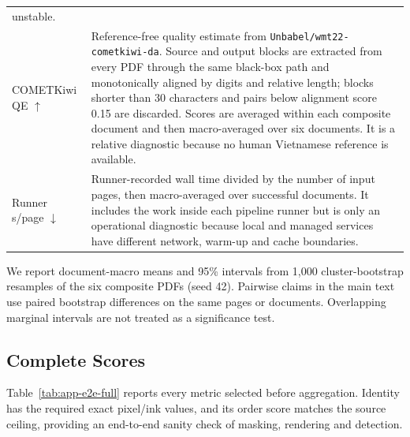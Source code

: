 \begin{table}[H]
\begin{tabularx}{\textwidth}{@{}l >{\raggedright\arraybackslash}X@{}}
unstable. \\
COMETKiwi QE $\uparrow$ & Reference-free quality estimate from
\texttt{Unbabel/wmt22-cometkiwi-da}. Source and output blocks are extracted from
every PDF through the same black-box path and monotonically aligned by digits and
relative length; blocks shorter than 30 characters and pairs below alignment
score 0.15 are discarded. Scores are averaged within each composite document and then
macro-averaged over six documents. It is a relative diagnostic because no human
Vietnamese reference is available. \\
Runner s/page $\downarrow$ & Runner-recorded wall time divided by the number of
input pages, then macro-averaged over successful documents. It includes the work
inside each pipeline runner but is only an operational diagnostic because local
and managed services have different network, warm-up and cache boundaries. \\
\bottomrule
\end{tabularx}
\end{table}

We report document-macro means and 95\% intervals from 1{,}000 cluster-bootstrap
resamples of the six composite PDFs (seed 42). Pairwise claims in the main text
use paired bootstrap differences on the same pages or documents. Overlapping
marginal intervals are not treated as a significance test.

\subsection{Complete Scores}

Table~\ref{tab:app-e2e-full} reports every metric selected before aggregation.
Identity has the required exact pixel/ink values, and its order score matches the
source ceiling, providing an end-to-end sanity check of masking, rendering and
detection.

